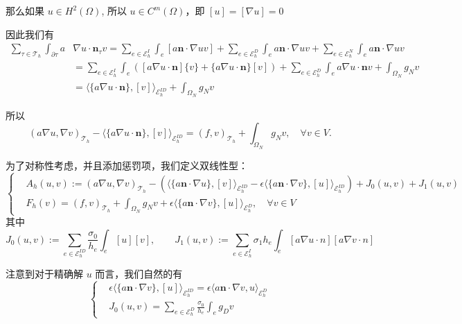 那么如果 $u\in H^2(\Omega)$, 所以 $u\in C^m(\Omega)$，即 $[u]=[\nabla u]=0$

因此我们有
$$\begin{aligned}
\sum_{\tau \in \mathscr{T}_{h}} \int_{\partial \tau} a & \nabla u \cdot \textbf{n}_{\tau} v=\sum_{e \in \mathcal{E}_{h}^{I}} \int_{e}[a \textbf{n}\cdot \nabla u  v] +\sum_{e \in \mathcal{E}_{h}^{D}} \int_{e} a\textbf{n}\cdot \nabla u  v + \sum_{e \in \mathcal{E}_{h}^{N}} \int_{e} a \textbf{n}\cdot \nabla u  v \\
& =\sum_{e \in \mathcal{E}_{h}^{I}} \int_{e}([a \nabla u \cdot \textbf{n}]\{v\}+\{a \nabla u \cdot \textbf{n}\}[v])+\sum_{e \in \mathcal{E}_{h}^{D}} \int_{e} a \nabla u \cdot \textbf{n} v +\int_{\Omega_N}g_Nv\\
& =\langle\{a \nabla u \cdot \textbf{n}\},[v]\rangle_{\mathcal{E}_{h}^{I D}}+\int_{\Omega_N}g_Nv
\end{aligned}$$

所以
$$(a \nabla u, \nabla v)_{\mathscr{T}_{h}}-\langle\{a \nabla u \cdot \textbf{n}\},[v]\rangle_{\mathcal{E}_{h}^{I D}}=(f, v)_{\mathscr{T}_h}+\int_{\Omega_N}g_Nv, \quad \forall v \in V .$$

为了对称性考虑，并且添加惩罚项，我们定义双线性型：
$$\left\{\begin{aligned}
    &A_{h}(u, v):=  (a \nabla u, \nabla v)_{\mathscr{T}_{h}}-\left(\langle\{a\textbf{n}\cdot \nabla u \},[v]\rangle_{\mathcal{E}_{h}^{I D}}-\epsilon\langle\{a \textbf{n}\cdot\nabla v \}, [u]\rangle_{\mathcal{E}_{h}^{I D}}\right)+J_{0}(u, v)+J_{1}(u, v)\\
    &F_h(v)=(f, v)_{\mathscr{T}_h}+\int_{\Omega_N}g_Nv+\epsilon\langle\{a \textbf{n}\cdot\nabla v \}, [u]\rangle_{\mathcal{E}_{h}^{D}}, \quad \forall v \in V
\end{aligned}\right.$$
其中 $$J_{0}(u, v):= \sum_{e \in \mathcal{E}_{h}^{I D}} \frac{\sigma_{0}}{h_{e}} \int_{e}[u][v],\qquad
J_{1}(u, v):= \sum_{e \in \mathcal{E}_{h}^{I}} \sigma_{1} h_{e} \int_{e}[a \nabla u \cdot n][a \nabla v \cdot n]$$

注意到对于精确解 $u$ 而言，我们自然的有 
$$\left\{\begin{aligned}
    &\epsilon\langle\{a \textbf{n}\cdot\nabla v \}, [u]\rangle_{\mathcal{E}_{h}^{I D}}=\epsilon\langle a \textbf{n}\cdot\nabla v, u\rangle_{\mathcal{E}_{h}^{D}}\\
    &J_{0}(u, v)= \sum_{e \in \mathcal{E}_{h}^{D}} \frac{\sigma_{0}}{h_{e}} \int_{e}g_Dv
\end{aligned}\right.$$


